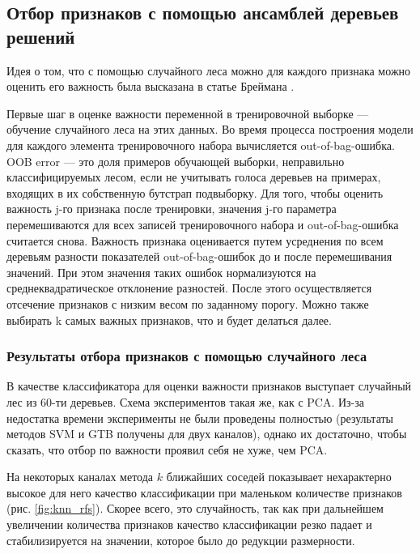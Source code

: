\subsection{Отбор признаков с помощью ансамблей деревьев решений}
Идея о том, что с помощью случайного леса можно для каждого признака можно оценить его важность была высказана в статье Бреймана \cite{breiman}.
\par
Первые шаг в оценке важности переменной в тренировочной выборке --- обучение случайного леса на этих данных. Во время процесса построения модели для каждого элемента тренировочного набора вычисляется out-of-bag-ошибка.
OOB error --- это доля примеров обучающей выборки, неправильно классифицируемых лесом, если не учитывать голоса деревьев на примерах, входящих в их собственную бутстрап подвыборку.
Для того, чтобы оценить важность j-го признака после тренировки, значения j-го параметра перемешиваются для всех записей тренировочного набора и out-of-bag-ошибка считается снова. Важность признака оценивается путем усреднения по всем деревьям разности показателей out-of-bag-ошибок до и после перемешивания значений. При этом значения таких ошибок нормализуются на среднеквадратическое отклонение разностей.
После этого осуществляется отсечение признаков с низким весом по заданному порогу. Можно также выбирать k самых важных признаков, что и будет делаться далее.
\subsubsection*{Результаты отбора признаков с помощью случайного леса}
В качестве классификатора для оценки важности признаков выступает случайный лес из 60-ти деревьев. Схема экспериментов такая же, как с PCA. Из-за недостатка времени эксперименты не были проведены полностью (результаты методов SVM и GTB получены для двух каналов), однако их достаточно, чтобы сказать, что отбор по важности проявил себя не хуже, чем PCA.
\par
На некоторых каналах метода \(k\) ближайших соседей показывает нехарактерно высокое для него качество классификации при маленьком количестве признаков (рис. \ref{fig:knn_rfs}). Скорее всего, это случайность, так как при дальнейшем увеличении количества признаков качество классификации резко падает и стабилизируется на значении, которое было до редукции размерности.


